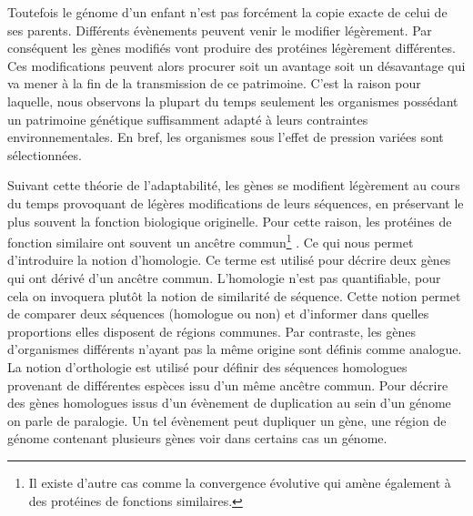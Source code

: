 \begin{refsegment}
    Toutefois le génome d’un enfant n’est pas forcément la copie exacte de celui de ses parents. Différents évènements peuvent venir le modifier légèrement. Par conséquent les gènes modifiés vont produire des protéines légèrement différentes. Ces modifications peuvent alors procurer soit un avantage soit un désavantage qui va mener à la fin de la transmission de ce patrimoine. C'est la raison pour laquelle, nous observons la plupart du temps seulement les organismes possédant un patrimoine génétique suffisamment adapté à leurs contraintes environnementales. En bref, les organismes sous l’effet de pression variées sont sélectionnées.
    
    Suivant cette théorie de l'adaptabilité, les gènes se modifient légèrement au cours du temps provoquant de légères modifications de leurs séquences, en préservant le plus souvent la fonction biologique originelle. Pour cette raison, les protéines de fonction similaire ont souvent un ancêtre commun\footnote{Il existe d'autre cas comme la convergence évolutive qui amène également à des protéines de fonctions similaires. } . Ce qui nous permet d'introduire la notion d'homologie. Ce terme est utilisé pour décrire deux gènes qui ont dérivé d'un ancêtre commun. L'homologie n'est pas quantifiable, pour cela on invoquera plutôt la notion de similarité de séquence. Cette notion permet de comparer deux séquences (homologue ou non) et d'informer dans quelles proportions elles disposent de régions communes. Par contraste, les gènes d’organismes différents n’ayant pas la même origine sont définis comme analogue. La notion d'orthologie est utilisé pour définir des séquences homologues provenant de différentes espèces issu d'un même ancêtre commun. Pour décrire des gènes homologues issus d'un évènement de duplication au sein d'un génome on parle de paralogie. Un tel évènement peut dupliquer un gène, une région de génome contenant plusieurs gènes  voir dans certains cas un génome.
    

\end{refsegment}
